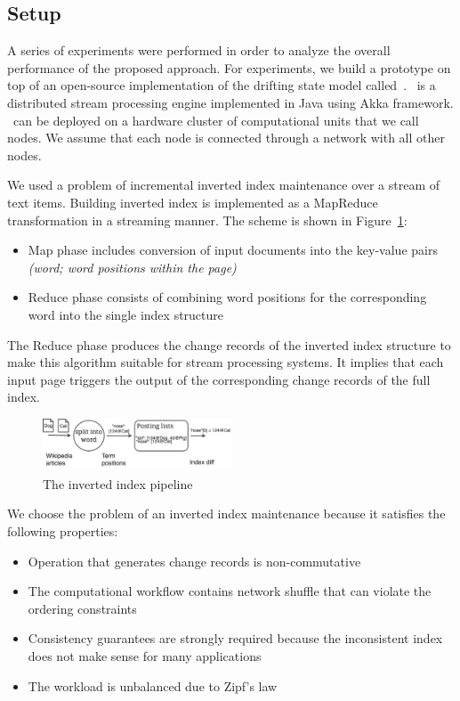 
\label {fs-experiments-seciton}

\subsection{Setup}
A series of experiments were performed in order to analyze the overall performance of the proposed approach. For experiments, we build a prototype on top of an open-source implementation of the drifting state model called~\FlameStream. \FlameStream\ is a distributed stream processing engine implemented in Java using Akka framework. \FlameStream\ can be deployed on a hardware cluster of computational units that we call nodes. We assume that each node is connected through a network with all other nodes.

We used a problem of incremental inverted index maintenance over a stream of text items. 
Building inverted index is implemented as a MapReduce transformation in a streaming manner. The scheme is shown in Figure~\ref{index}: 

\begin{itemize}
    \item Map phase includes conversion of input documents into the key-value pairs {\it (word; word positions within the page)}
    \item Reduce phase consists of combining word positions for the corresponding word into the single index structure 
\end{itemize}

The Reduce phase produces the change records of the inverted index structure to make this algorithm suitable for stream processing systems. It implies that each input page triggers the output of the corresponding change records of the full index.

\begin{figure}[htbp]
  \centering
  \includegraphics[width=0.50\textwidth]{pics/index}
  \caption{The inverted index pipeline}
  \label {index}
\end{figure}

We choose the problem  of  an inverted index maintenance  because it satisfies the following properties:

\begin{itemize}
    \item Operation that generates change records is non-commutative
    \item The computational workflow    contains network shuffle that can violate the ordering constraints
    \item Consistency guarantees are strongly required because the inconsistent index does not make sense for many applications
    \item The workload is unbalanced due to Zipf's law
\end{itemize}

